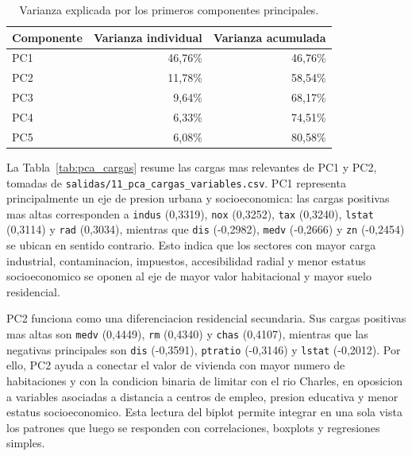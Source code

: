 \documentclass[10pt,a4paper]{article}
\begin{document}
\begin{table}[H]
  \centering
  \caption{Varianza explicada por los primeros componentes principales.}
  \label{tab:pca_varianza}
  \footnotesize
  \begin{tabular}{l r r}
    \toprule
    \textbf{Componente} & \textbf{Varianza individual} & \textbf{Varianza acumulada} \\
    \midrule
    PC1 & 46,76\% & 46,76\% \\
    PC2 & 11,78\% & 58,54\% \\
    PC3 & 9,64\% & 68,17\% \\
    PC4 & 6,33\% & 74,51\% \\
    PC5 & 6,08\% & 80,58\% \\
    \bottomrule
  \end{tabular}
\end{table}

La Tabla~\ref{tab:pca_cargas} resume las cargas mas relevantes de PC1 y PC2, tomadas de \texttt{salidas/11\_pca\_cargas\_variables.csv}. PC1 representa principalmente un eje de presion urbana y socioeconomica: las cargas positivas mas altas corresponden a \texttt{indus} (0,3319), \texttt{nox} (0,3252), \texttt{tax} (0,3240), \texttt{lstat} (0,3114) y \texttt{rad} (0,3034), mientras que \texttt{dis} (-0,2982), \texttt{medv} (-0,2666) y \texttt{zn} (-0,2454) se ubican en sentido contrario. Esto indica que los sectores con mayor carga industrial, contaminacion, impuestos, accesibilidad radial y menor estatus socioeconomico se oponen al eje de mayor valor habitacional y mayor suelo residencial.

PC2 funciona como una diferenciacion residencial secundaria. Sus cargas positivas mas altas son \texttt{medv} (0,4449), \texttt{rm} (0,4340) y \texttt{chas} (0,4107), mientras que las negativas principales son \texttt{dis} (-0,3591), \texttt{ptratio} (-0,3146) y \texttt{lstat} (-0,2012). Por ello, PC2 ayuda a conectar el valor de vivienda con mayor numero de habitaciones y con la condicion binaria de limitar con el rio Charles, en oposicion a variables asociadas a distancia a centros de empleo, presion educativa y menor estatus socioeconomico. Esta lectura del biplot permite integrar en una sola vista los patrones que luego se responden con correlaciones, boxplots y regresiones simples.
\end{document}
